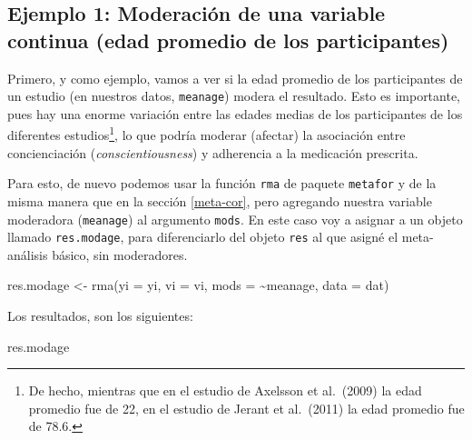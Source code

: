 \documentclass[
  bookmarksnumbered]{article}
\newenvironment{Shaded}{\begin{snugshade}}{\end{snugshade}}
\newcommand{\AttributeTok}[1]{\textcolor[rgb]{0.00,0.34,0.68}{#1}}
\newcommand{\FunctionTok}[1]{\textcolor[rgb]{0.39,0.29,0.61}{#1}}
\newcommand{\NormalTok}[1]{\textcolor[rgb]{0.12,0.11,0.11}{#1}}
\newcommand{\OtherTok}[1]{\textcolor[rgb]{0.00,0.43,0.16}{#1}}
\newcommand{\SpecialCharTok}[1]{\textcolor[rgb]{0.24,0.68,0.91}{#1}}
\begin{document}
\hypertarget{ex.mod1}{%
\subsection{Ejemplo 1: Moderación de una variable continua (edad promedio de los participantes)}\label{ex.mod1}}

Primero, y como ejemplo, vamos a ver si la edad promedio de los participantes de un estudio (en nuestros datos, \texttt{meanage}) modera el resultado. Esto es importante, pues hay una enorme variación entre las edades medias de los participantes de los diferentes estudios\footnote{De hecho, mientras que en el estudio de Axelsson et al.~(2009) la edad promedio fue de 22, en el estudio de Jerant et al.~(2011) la edad promedio fue de 78.6.}, lo que podría moderar (afectar) la asociación entre concienciación (\emph{conscientiousness}) y adherencia a la medicación prescrita.

Para esto, de nuevo podemos usar la función \texttt{rma} de paquete \texttt{metafor} y de la misma manera que en la sección \ref{meta-cor}, pero agregando nuestra variable moderadora (\texttt{meanage}) al argumento \texttt{mods}. En este caso voy a asignar a un objeto llamado \texttt{res.modage}, para diferenciarlo del objeto \texttt{res} al que asigné el meta-análisis básico, sin moderadores.

\begin{Shaded}
\begin{Highlighting}[]
\NormalTok{res.modage }\OtherTok{\textless{}{-}} \FunctionTok{rma}\NormalTok{(}\AttributeTok{yi =}\NormalTok{ yi, }\AttributeTok{vi =}\NormalTok{ vi, }\AttributeTok{mods =} \SpecialCharTok{\textasciitilde{}}\NormalTok{meanage, }\AttributeTok{data =}\NormalTok{ dat)}
\end{Highlighting}
\end{Shaded}

Los resultados, son los siguientes:

\begin{Shaded}
\begin{Highlighting}[]
\NormalTok{res.modage}
\end{Highlighting}
\end{Shaded}
\end{document}

